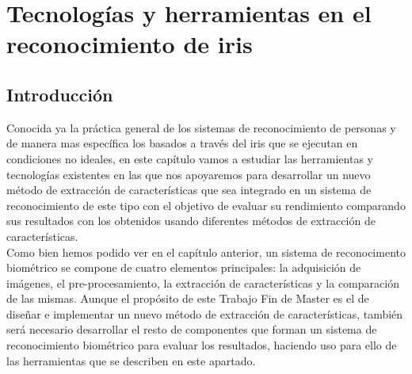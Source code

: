 
\chapter{Tecnologías y herramientas en el reconocimiento de iris} %

\label{Capítulo 3} %




\section{Introducción}

Conocida ya la práctica general de los sistemas de reconocimiento de personas y de manera mas específica los basados a través del iris que se ejecutan en condiciones no ideales, en este capítulo vamos a estudiar las herramientas y tecnologías existentes en las que nos apoyaremos para desarrollar un nuevo método de extracción de características que sea integrado en un sistema de reconocimiento de este tipo con el objetivo de evaluar su rendimiento comparando sus resultados con los obtenidos usando diferentes métodos de extracción de características. \\

Como bien hemos podido ver en el capítulo anterior, un sistema de reconocimento biométrico se compone de cuatro elementos principales: la adquisición de imágenes, el pre-procesamiento, la extracción de características y la comparación de las mismas. Aunque el propósito de este Trabajo Fin de Master es el de diseñar e implementar un nuevo método de extracción de características, también será necesario desarrollar el resto de componentes que forman un sistema de reconocimiento biométrico para evaluar los resultados, haciendo uso para ello de las herramientas que se describen en este apartado.\\ 

